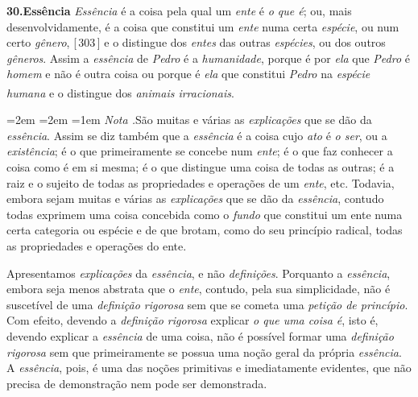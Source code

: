 \documentclass[12pt,a4paper]{article}
\newcommand{\pg}[1]{\thinspace\textup{[\,#1\,]}\thinspace}
\newcommand{\tese}[2]{\bigskip\noindent\textbf{#1.\quad #2}\;\textemdash\;}
\renewcommand\footnote[1]{%
    \stepcounter{footnote}\textsuperscript{\thefootnote}%
    \par
    {\footnotesize
     \leftskip=2em \rightskip=2em \parindent=1em
     \addvspace{\medskipamount}%
     \noindent\textit{Nota \thefootnote.}\enspace #1\par
     \addvspace{\medskipamount}}%
  }
\begin{document}
\tese{30}{Essência} \emph{Essência} é a coisa pela qual um \emph{ente} é
\emph{o que é}; ou, mais desenvolvidamente, é a coisa que constitui um
\emph{ente} numa certa \emph{espécie}, ou num certo \emph{gênero}, \pg{303} e o
distingue dos \emph{entes} das outras \emph{espécies}, ou dos outros
\emph{gêneros}. Assim a \emph{essência} de \emph{Pedro} é a \emph{humanidade},
porque é por \emph{ela} que \emph{Pedro} é \emph{homem} e não é outra coisa
\textemdash{} ou porque é \emph{ela} que constitui \emph{Pedro} na \emph{espécie
humana} e o distingue dos \emph{animais irracionais}.\footnote{São muitas e
várias as \emph{explicações} que se dão da \emph{essência}. Assim se diz também
que a \emph{essência} \textemdash{} é a coisa cujo \emph{ato} é \emph{o ser}, ou
a \emph{existência}; \textemdash{} é o que primeiramente se concebe num
\emph{ente}; \textemdash{} é o que faz conhecer a coisa como é em si mesma;
\textemdash{} é o que distingue uma coisa de todas as outras; \textemdash{} é a
raiz e o sujeito de todas as propriedades e operações de um \emph{ente}, etc.
Todavia, embora sejam muitas e várias as \emph{explicações} que se dão da
\emph{essência}, contudo todas exprimem uma coisa concebida como o \emph{fundo}
que constitui um ente numa certa categoria ou espécie e de que brotam, como do
seu princípio radical, todas as propriedades e operações do ente.

  Apresentamos \emph{explicações} da \emph{essência}, e não \emph{definições}.
  Porquanto a \emph{essência}, embora seja menos abstrata que o \emph{ente},
  contudo, pela sua simplicidade, não é suscetível de uma \emph{definição
  rigorosa} sem que se cometa uma \emph{petição de princípio}. Com efeito,
  devendo a \emph{definição rigorosa} explicar \emph{o que uma coisa é}, isto é,
  devendo explicar a \emph{essência} de uma coisa, não é possível formar uma
  \emph{definição rigorosa} sem que primeiramente se possua uma noção geral da
  própria \emph{essência}. A \emph{essência}, pois, é uma das noções primitivas
  e imediatamente evidentes, que não precisa de demonstração nem pode ser
  demonstrada.

}
\end{document}
